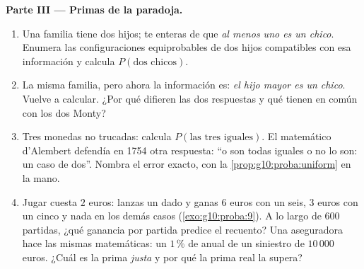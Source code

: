 \begin{problem}
\medskip
\noindent\textbf{Parte III --- Primas de la paradoja.}
\begin{enumerate}[resume]
  \item Una familia tiene dos hijos; te enteras de que \emph{al menos uno
        es un chico}. Enumera las configuraciones equiprobables de dos
        hijos compatibles con esa información y calcula
        $P(\text{dos chicos})$.
  \item La misma familia, pero ahora la información es: \emph{el hijo
        mayor es un chico}. Vuelve a calcular. ¿Por qué difieren las dos
        respuestas y qué tienen en común con los dos Monty?
  \item Tres monedas no trucadas: calcula $P(\text{las tres iguales})$. El
        matemático d'Alembert defendía en 1754 otra respuesta: ``o son
        todas iguales o no lo son: un caso de dos''. Nombra el error
        exacto, con la \cref{prop:g10:proba:uniform} en la mano.
  \item Jugar cuesta $2$ euros: lanzas un dado y ganas $6$ euros con un
        seis, $3$ euros con un cinco y nada en los demás casos
        (\cref{exo:g10:proba:9}). A lo largo de $600$ partidas, ¿qué
        ganancia  por partida predice el recuento? Una aseguradora
        hace las mismas matemáticas: un $1\,\%$ de  anual de
        un siniestro de $10\,000$ euros. ¿Cuál es la prima \emph{justa} y
        por qué la prima real la supera?
\end{enumerate}


\end{problem}
